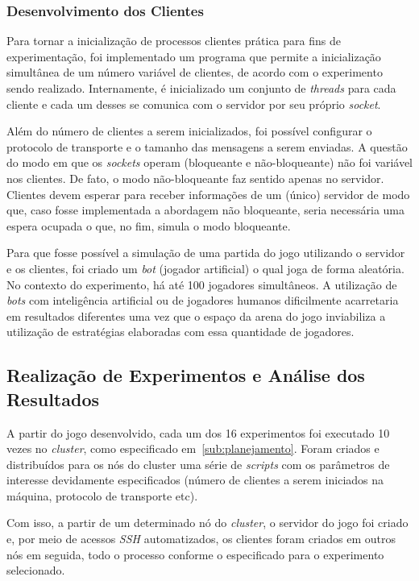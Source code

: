 \documentclass[12pt]{article}
\begin{document}
\subsubsection{Desenvolvimento dos Clientes}

Para tornar a inicialização de processos clientes prática para fins de
experimentação, foi implementado um programa que permite a inicialização
simultânea de um número variável de clientes, de acordo com o experimento sendo
realizado. Internamente, é inicializado um conjunto de \textit{threads} para
cada cliente e cada um desses se comunica com o servidor por seu próprio
\textit{socket}.

Além do número de clientes a serem inicializados, foi possível configurar o
protocolo de transporte e o tamanho das mensagens a serem enviadas. A questão
do modo em que os \textit{sockets} operam (bloqueante e não-bloqueante) não foi
variável nos clientes. De fato, o modo não-bloqueante faz sentido apenas no
servidor. Clientes devem esperar para receber informações de um (único)
servidor de modo que, caso fosse implementada a abordagem não bloqueante, seria
necessária uma espera ocupada o que, no fim, simula o modo bloqueante.

Para que fosse possível a simulação de uma partida do jogo utilizando o
servidor e os clientes, foi criado um \textit{bot} (jogador artificial) o qual
joga de forma aleatória. No contexto do experimento, há até 100
jogadores simultâneos.  A utilização de \textit{bots} com inteligência
artificial ou de jogadores humanos dificilmente acarretaria em resultados
diferentes uma vez que o espaço da arena do jogo inviabiliza a utilização de
estratégias elaboradas com essa quantidade de jogadores.

\subsection{Realização de Experimentos e Análise dos Resultados} \label{sub:realizacao} 

A partir do jogo desenvolvido, cada um dos 16 experimentos foi executado 10
vezes no \textit{cluster}, como especificado em~\ref{sub:planejamento}. Foram
criados e distribuídos para os nós do cluster uma série de \textit{scripts}
com os parâmetros de interesse devidamente especificados (número de clientes a
serem iniciados na máquina, protocolo de transporte etc).

Com isso, a partir de um determinado nó do \textit{cluster}, o servidor do jogo
foi criado e, por meio de acessos \emph{SSH} automatizados, os clientes foram criados
em outros nós em seguida, todo o processo conforme o especificado para o
experimento selecionado.
\end{document}
